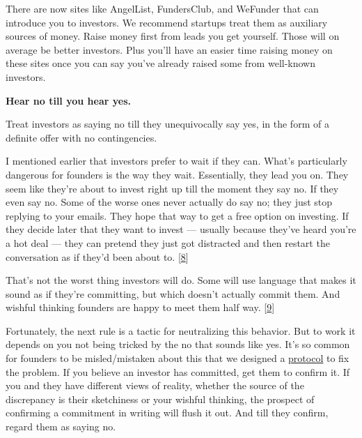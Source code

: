 There
                    are now sites like AngelList, FundersClub, and WeFunder that
                    can introduce you to investors. We recommend startups treat
                    them as auxiliary sources of money. Raise money first from
                    leads you get yourself. Those will on average be better
                    investors. Plus you'll have an easier time raising money on
                    these sites once you can say you've already raised some from
                    well-known investors.


                    \textbf{Hear no till you hear yes.}

Treat investors
                    as saying no till they unequivocally say yes, in the form of
                    a definite offer with no contingencies.

I
                    mentioned earlier that investors prefer to wait if they can.
                    What's particularly dangerous for founders is the way they
                    wait. Essentially, they lead you on. They seem like they're
                    about to invest right up till the moment they say no. If
                    they even say no. Some of the worse ones never actually do
                    say no; they just stop replying to your emails. They hope
                    that way to get a free option on investing. If they decide
                    later that they want to invest --- usually because
                    they've heard you're a hot deal --- they can pretend
                    they just got distracted and then restart the conversation
                    as if they'd been about to.
                    [\href{\#f8n}{8}]

That's not the worst thing investors will do.
                    Some will use language that makes it sound as if they're
                    committing, but which doesn't actually commit them. And
                    wishful thinking founders are happy to meet them half way.
                    [\href{\#f9n}{9}]

Fortunately, the next rule is a tactic for
                    neutralizing this behavior. But to work it depends on you
                    not being tricked by the no that sounds like yes. It's so
                    common for founders to be misled/mistaken about this that we
                    designed a
                    \href{http://ycombinator.com/hdp.html}{protocol} to
                    fix the problem. If you believe an investor has committed,
                    get them to confirm it. If you and they have different views
                    of reality, whether the source of the discrepancy is their
                    sketchiness or your wishful thinking, the prospect of
                    confirming a commitment in writing will flush it out. And
                    till they confirm, regard them as saying no.


